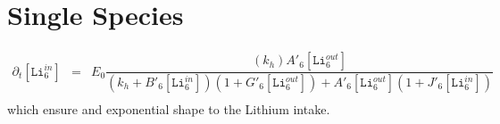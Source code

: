 \documentclass[aps,onecolumn,11pt]{revtex4}
\newcommand{\mychem}[1]{\mathtt{#1}}
\newcommand{\myconc}[1]{\left\lbrack{#1}\right\rbrack}
\newcommand{\LiIn}[1]{\myconc{\mychem{Li}_{#1}^{in}}}
\newcommand{\LiOut}[1]{\myconc{\mychem{Li}_{#1}^{out}}}
\begin{document}
\section{Single Species}

\begin{equation}
	\begin{array}{rcl}
	\partial_t \LiIn{6} & = & E_0 
	\dfrac{
	\left(k_h \right) A'_6 \LiOut{6} 
	 }
	{
	\left(k_h + B'_6 \LiIn{6} \right) \left(1 + G'_6 \LiOut{6} \right)
	+A'_6 \LiOut{6}\left(1 + J'_6 \LiIn{6}\right)
	}\\
	\end{array}
\end{equation}	
which ensure and exponential shape to the Lithium intake.
\end{document}
